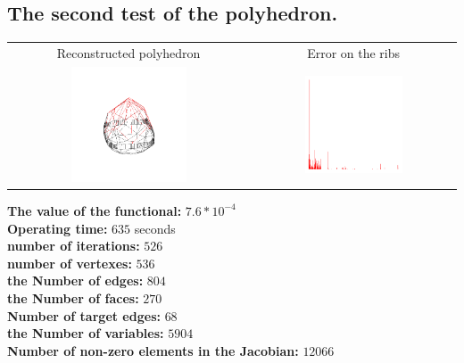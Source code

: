 \documentclass[11pt,fleqn,a4paper]{scrartcl}
\begin{document}
\subsection{The second test of the polyhedron.}
\begin{center}
\begin{tabular}{|c|c|}
\hline
Reconstructed polyhedron & Error on the ribs\\
\includegraphics[width=0.5\textwidth]{bigout2.png} &
\includegraphics[width=0.5\textwidth]{bigerror2.png} \\
\hline
\end{tabular}
\end{center}
\textbf{The value of the functional:} $7.6*10^{-4}$\\
\textbf{Operating time:} $635$ seconds\\
\textbf{number of iterations:} $526$\\
\textbf{number of vertexes:} $536$\\
\textbf{the Number of edges:} $804$\\
\textbf{the Number of faces:} $270$\\
\textbf{Number of target edges:} $68$ \\
\textbf{the Number of variables:} $5904$\\
\textbf{Number of non-zero elements in the Jacobian:} $12066$\\
\end{document}
